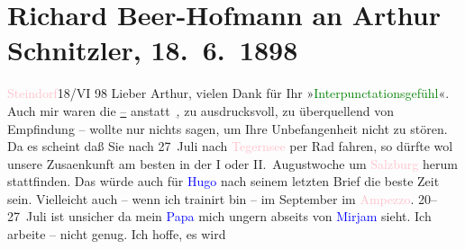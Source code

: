 

               \section[Richard Beer-Hofmann an Arthur Schnitzler, 18. 6. 1898]{ Richard Beer-Hofmann an Arthur Schnitzler, 18. 6. 1898}\nopagebreak{}\rehead{ }\normalsize\beginnumbering{} \toendnotes[C]{\smallbreak\pagebreak[2]} 
\toendnotes[C]{\smallbreak}\pstart
           \raggedleft{}{\pb}\textcolor{pink}{Steindorf}{}\ledrightnote{\textcolor{pink}{Steindorf am Ossiacher See}}{ }18/VI 98\pend
           \pstart
           Lieber Arthur, vielen Dank für Ihr »\textcolor{green}{Interpunctationsgefühl}{}«. Auch mir waren die
                  \uline{–} anstatt \uline{,} zu
               ausdrucksvoll, zu überquellend von Empfindung – wollte nur nichts sagen, um Ihre
               Unbefangenheit nicht zu stören.\pend
           \pstart
           Da es scheint daß Sie  nach
                  27 Juli nach \textcolor{pink}{Tegernsee}{}\ledrightnote{\textcolor{pink}{Tegernsee}} per Rad
               fahren, so dürfte wol unsere Zusa{\geminationm}enkunft {\pb}am besten in der I oder
                  II. Augustwoche um \textcolor{pink}{Salzburg}{}\ledrightnote{\textcolor{pink}{Salzburg}} herum
               stattfinden. Das würde auch für \textcolor{blue}{Hugo}{}\ledrightnote{\textcolor{blue}{Hugo von Hofmannsthal}} nach seinem
               letzten Brief die beste Zeit sein.\pend
           \pstart
           Vielleicht auch – wenn ich trainirt bin – im September im \textcolor{pink}{Ampezzo}{}\ledrightnote{\textcolor{pink}{Valle d’Ampezzo}}. 20–27 Juli ist
               unsicher da mein \textcolor{blue}{Papa}{} mich
               ungern abseits von \textcolor{blue}{Mirjam}{}\ledrightnote{\textcolor{blue}{Mirjam Beer-Hofmann}} sieht. Ich arbeite {\pb}– nicht genug. Ich hoffe, es wird
